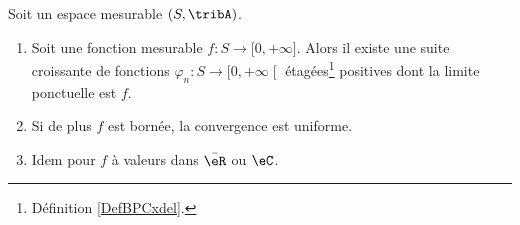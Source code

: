 \begin{theorem}\label{THOooXHIVooKUddLi}
	Soit un espace mesurable \( (S,\tribA)\).
	\begin{enumerate}
		\item
		      Soit une fonction mesurable \( f\colon S\to \mathopen[ 0 , +\infty \mathclose]\). Alors il existe une suite croissante de fonctions \( \varphi_n\colon S\to \mathopen[ 0 , +\infty \mathclose[\) étagées\footnote{Définition \ref{DefBPCxdel}.} positives dont la limite ponctuelle est \( f\).
		\item
		      Si de plus \( f\) est bornée, la convergence est uniforme.
		\item
		      Idem pour \( f\) à valeurs dans \( \bar \eR\) ou \( \eC\).
	\end{enumerate}
\end{theorem}

